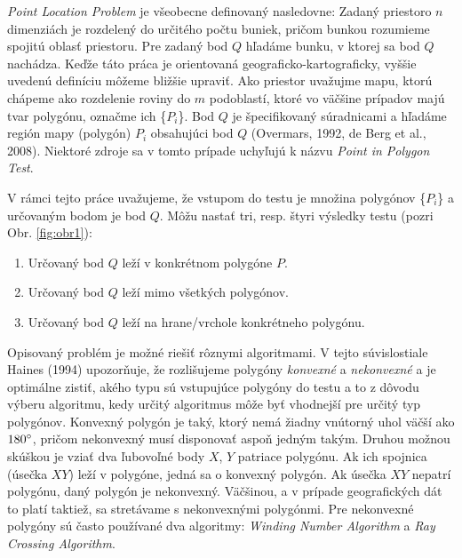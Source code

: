 \documentclass[11pt]{article}
\begin{document}
\textit{Point Location Problem} je všeobecne definovaný nasledovne: Zadaný priestor\linebreak o $n$ dimenziách je rozdelený do určitého počtu buniek, pričom bunkou rozumieme spojitú oblasť priestoru. Pre zadaný bod $Q$ hľadáme bunku, v ktorej sa bod $Q$ nachádza. Keďže táto práca je orientovaná geograficko-kartograficky, vyššie uvedenú definíciu môžeme bližšie upraviť. Ako priestor uvažujme mapu, ktorú chápeme ako rozdelenie roviny do $m$ podoblastí, 
ktoré vo väčšine prípadov majú tvar polygónu, označme ich \{$P_i$\}. Bod $Q$ je špecifikovaný súradnicami a hľadáme región mapy (polygón) $P_i$ obsahujúci bod $Q$  (Overmars, 1992, 
de Berg et al., 2008). Niektoré zdroje sa v tomto prípade uchyľujú k názvu \textit{Point in Polygon Test}. 

V rámci tejto práce uvažujeme, že vstupom do testu je množina polygónov \{$P_i$\} a určovaným bodom je bod $Q$. Môžu nastať tri, resp. štyri výsledky testu (pozri Obr. \ref{fig:obr1}):
\begin{enumerate}[label=(\alph*),,leftmargin=1.59\parindent]
    \item Určovaný bod $Q$ leží v konkrétnom polygóne $P$.
    \item Určovaný bod $Q$ leží mimo všetkých polygónov.
    \item Určovaný bod $Q$ leží na hrane/vrchole konkrétneho polygónu.
\end{enumerate}

Opisovaný problém je možné riešiť rôznymi algoritmami. V tejto súvislosti\linebreak ale Haines (1994) upozorňuje, že rozlišujeme polygóny \textit{konvexné} a \textit{nekonvexné} a je optimálne zistiť, akého typu sú vstupujúce polygóny do testu a to z dôvodu výberu algoritmu, kedy určitý algoritmus môže byť vhodnejší pre určitý typ polygónov. Konvexný polygón je taký, ktorý nemá žiadny vnútorný uhol väčší ako $180 \degree$, pričom nekonvexný musí disponovať aspoň jedným takým. Druhou možnou skúškou je vziať dva ľubovoľné body $X$, $Y$ patriace polygónu. Ak ich spojnica (úsečka $XY$) leží v polygóne, jedná sa o konvexný polygón. Ak úsečka $XY$ nepatrí polygónu, daný polygón je nekonvexný. Väčšinou, a v prípade geografických dát to platí taktiež, sa stretávame s nekonvexnými polygónmi. Pre nekonvexné polygóny sú často používané dva algoritmy: \textit{Winding Number Algorithm} a \textit{Ray Crossing Algorithm}.

\newpage
\end{document}

